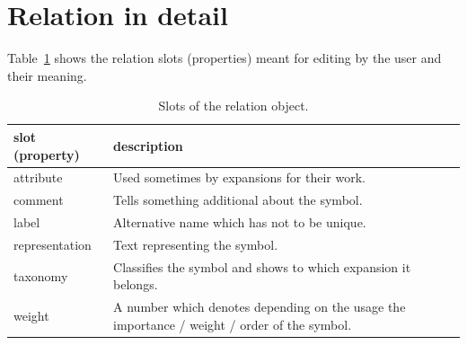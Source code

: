 \documentclass[a4paper, 12pt, openany]{scrbook}
\begin{document}
\section{Relation in detail}
Table~\ref{tab:relation} shows the relation slots (properties) meant for editing by the user and their meaning.
\begin{table}[htbp]
\centering
\begin{tabular}{|p{2.5cm}|p{13cm}|}
  \hline
  \textbf{slot (property)} & \textbf{description} \\
  \hline
  attribute & Used sometimes by expansions for their work. \\
  \hline
  comment & Tells something additional about the symbol. \\
  \hline
  label & Alternative name which has not to be unique. \\
  \hline
  representation & Text representing the symbol. \\
  \hline
  taxonomy & Classifies the symbol and shows to which expansion it belongs. \\
  \hline
  weight & A number which denotes depending on the usage the importance / weight / order of the symbol. \\
  \hline
\end{tabular}
\caption{Slots of the relation object.}
\label{tab:relation}
\end{table}
\end{document}
